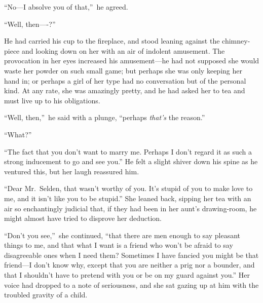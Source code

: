 \documentclass[12pt,a4paper]{book}
\begin{document}
``No---I absolve you of that,''\ he agreed.





``Well, then----?''





He had carried his cup to the fireplace, and stood leaning
against the chimney-piece and looking down on her with an air of
indolent amusement. The provocation in her eyes increased his
amusement---he had not supposed she would waste her powder on such
small game; but perhaps she was only keeping her hand in; or
perhaps a girl of her type had no conversation but of the
personal kind. At any rate, she was amazingly pretty, and he had
asked her to tea and must live up to his obligations.





``Well, then,''\ he said with a plunge, ``perhaps \textit{that's} the reason.''





``What?''





``The fact that you don't want to marry me. Perhaps I don't regard
it as such a strong inducement to go and see you.'' He felt
a slight shiver down his spine as he ventured this, but her laugh
reassured him.





``Dear Mr.\ Selden, that wasn't worthy of you. It's stupid of you
to make love to me, and it isn't like you to be stupid.'' She
leaned back, sipping her tea with an air so enchantingly judicial
that, if they had been in her aunt's drawing-room, he might
almost have tried to disprove her deduction.





``Don't you see,''\ she continued, ``that there are men enough to say
pleasant things to me, and that what I want is a friend who won't
be afraid to say disagreeable ones when I need them? Sometimes I
have fancied you might be that friend---I don't know why, except
that you are neither a prig nor a bounder, and that I shouldn't
have to pretend with you or be on my guard against you.'' Her
voice had dropped to a note of seriousness, and she sat gazing up
at him with the troubled gravity of a child.
\end{document}
